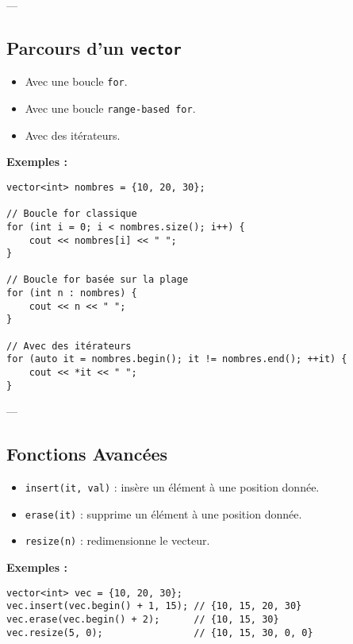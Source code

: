 ---

\subsection{ Parcours d'un \texttt{vector}}
\begin{itemize}
    \item Avec une boucle \texttt{for}.
    \item Avec une boucle \texttt{range-based for}.
    \item Avec des itérateurs.
\end{itemize}

\textbf{Exemples :}
\begin{tcolorbox}[colframe=blue!50!black, colback=blue!5!white, title=Exemple de Parcours d'un vector]
\begin{verbatim}
vector<int> nombres = {10, 20, 30};

// Boucle for classique
for (int i = 0; i < nombres.size(); i++) {
    cout << nombres[i] << " ";
}

// Boucle for basée sur la plage
for (int n : nombres) {
    cout << n << " ";
}

// Avec des itérateurs
for (auto it = nombres.begin(); it != nombres.end(); ++it) {
    cout << *it << " ";
}
\end{verbatim}
\end{tcolorbox}

---

\subsection{ Fonctions Avancées}
\begin{itemize}
    \item \texttt{insert(it, val)} : insère un élément à une position donnée.
    \item \texttt{erase(it)} : supprime un élément à une position donnée.
    \item \texttt{resize(n)} : redimensionne le vecteur.
\end{itemize}

\textbf{Exemples :}
\begin{tcolorbox}[colframe=blue!50!black, colback=blue!5!white, title=Exemple de Fonctions Avancées]
\begin{verbatim}
vector<int> vec = {10, 20, 30};
vec.insert(vec.begin() + 1, 15); // {10, 15, 20, 30}
vec.erase(vec.begin() + 2);      // {10, 15, 30}
vec.resize(5, 0);                // {10, 15, 30, 0, 0}
\end{verbatim}
\end{tcolorbox}

